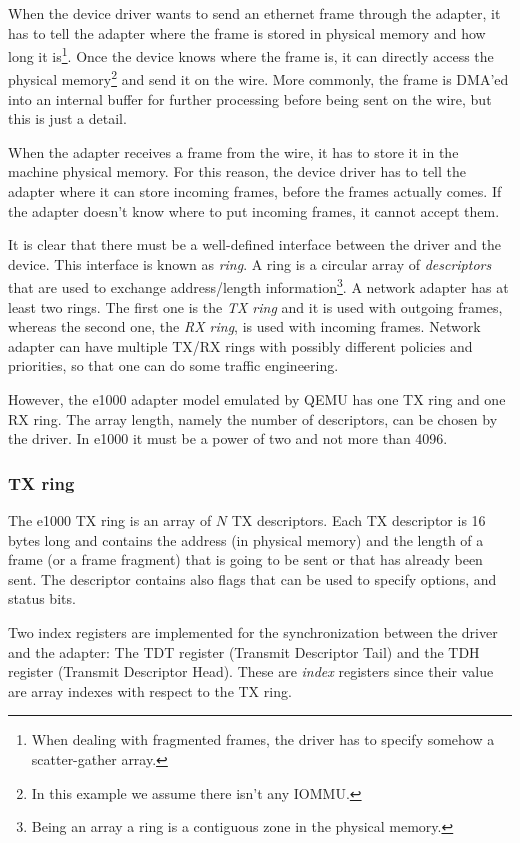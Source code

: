 When the device driver wants to send an ethernet frame through the adapter, it has to tell the adapter where the frame is stored
in physical memory and how long it is\footnote{When dealing with fragmented frames, the driver has to specify somehow a scatter-gather
array.}. Once the device knows where the frame is, it can directly access the physical memory\footnote{In this example we assume
there isn't any IOMMU.} and send it on the wire. More commonly, the frame is DMA'ed into an internal buffer for further processing before
being sent on the wire, but this is just a detail.

When the adapter receives a frame from the wire, it has to store it in the machine physical memory. For this reason, the device driver
has to tell the adapter where it can store incoming frames, before the frames actually comes. If the adapter doesn't know where to put
incoming frames, it cannot accept them.

\vspace{0.5cm}

It is clear that there must be a well-defined interface between the driver and the device. This interface is known as \emph{ring}.
A ring is a circular array of \emph{descriptors} that are used to exchange address/length information\footnote{Being an array a ring is a 
contiguous zone in the physical memory.}. A network adapter has at least two rings.
The first one is the \emph{TX ring} and it is used with outgoing frames, whereas the second one, the \emph{RX ring}, is used with
incoming frames. Network adapter can have multiple TX/RX rings with possibly different policies and priorities, so that one can
do some traffic engineering.

However, the e1000 adapter model emulated by QEMU has one TX ring and one RX ring. The array length, namely the number of descriptors,
can be chosen by the driver. In e1000 it must be a power of two and not more than 4096.


\subsubsection{TX ring}
\label{sec:txring}
The e1000 TX ring is an array of $N$ TX descriptors. Each TX descriptor is 16 bytes long and contains the address (in physical memory) and the
length of a frame (or a frame fragment) that is going to be sent or that has already been sent. The descriptor contains also flags that
can be used to specify options, and status bits. 

Two index registers are implemented for the synchronization between the driver and the adapter:
The TDT register (Transmit Descriptor Tail) and the TDH register (Transmit Descriptor Head). These are \emph{index} registers since
their value are array indexes with respect to the TX ring.

